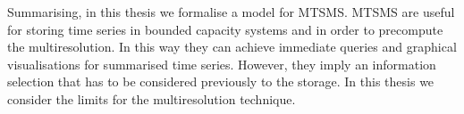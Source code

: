 Summarising, in this thesis we formalise a model for \gls{MTSMS}.
\gls{MTSMS} are useful for storing time series in bounded capacity
systems and in order to precompute the multiresolution. In this way
they can achieve immediate queries and graphical visualisations for
summarised time series.  However, they imply an information selection
that has to be considered previously to the storage. In this thesis we
consider the limits for the multiresolution technique.






